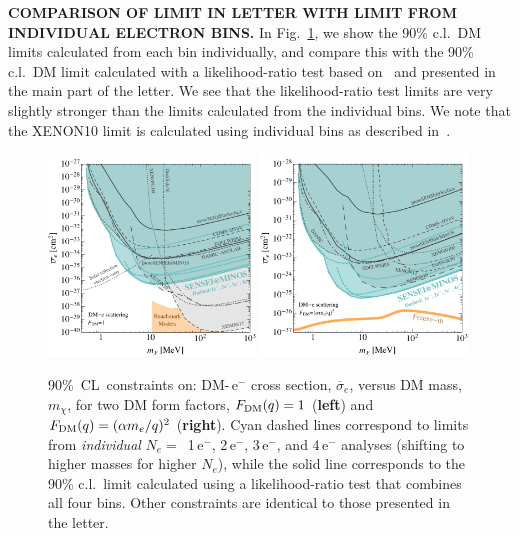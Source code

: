 \documentclass[aps,prl,twocolumn,showpacs,superscriptaddress,preprintnumbers]{revtex4-1}
\newcommand{\unit}[1]{\ensuremath{\mathrm{\,#1}}\xspace}
\newcommand{\e}{\unit{e^{-}}}
\begin{document}
\newpage %
\noindent \textbf{COMPARISON OF LIMIT IN LETTER WITH LIMIT FROM INDIVIDUAL ELECTRON BINS.}
In Fig.~\ref{fig:DMresultsIndividualLines}, we show the 90\% c.l.~DM limits calculated from each bin individually, and compare this with the 90\% c.l.~DM limit calculated with a likelihood-ratio test based on~\cite{Cowan:2010js} and presented in the main part of the letter.  We see that the likelihood-ratio test limits are very slightly stronger than the limits calculated from the individual bins. We note that the XENON10 limit is calculated using individual bins as described in~\cite{Essig:2017kqs}. 

\begin{figure}[b!]
\begin{center}
\includegraphics[width=0.49\textwidth]{SENSEI_MINOS2020_FDM1-Paper-with-Lines.pdf} 
 \includegraphics[width=0.49\textwidth]{SENSEI_MINOS2020_FDMq2-Paper-with-Lines.pdf}
    \caption{
90\%~CL~constraints on: DM-\e cross section, $\overline{\sigma}_e$, 
versus DM mass, $m_\chi$, for two DM form factors, $F_{\rm DM}(q)=1$ (\textbf{left}) and $F_{\rm DM}(q)=(\alpha m_e/q)^2$ (\textbf{right}). 
Cyan dashed lines correspond to limits from \textit{individual} $N_e =$~1\e, 2\e, 3\e, and 4\e  analyses (shifting to higher masses for higher $N_e$), while the solid line corresponds to the 90\% c.l.~limit calculated using a likelihood-ratio test that combines all four bins.  Other constraints are identical to those presented in the letter. 
 }
\label{fig:DMresultsIndividualLines}
\end{center}
\end{figure}
\end{document}
